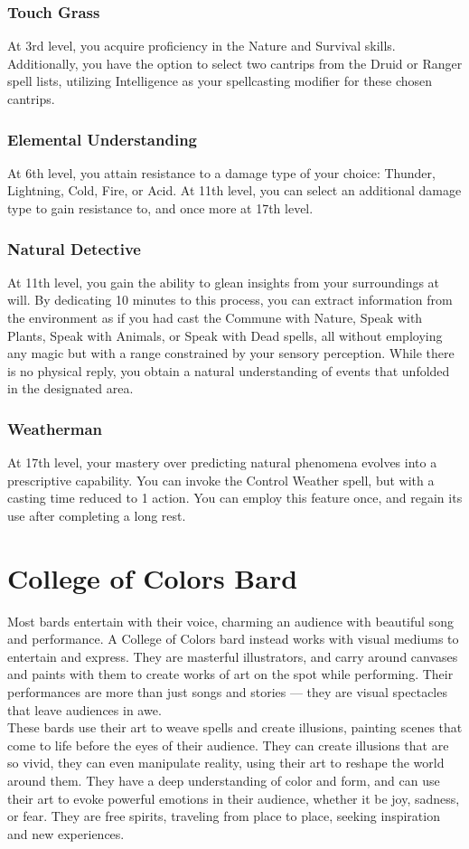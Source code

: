 \subsubsection{Touch Grass}
At 3rd level, you acquire proficiency in the Nature and Survival skills. Additionally, you have the option to select two cantrips from the Druid or Ranger spell lists, utilizing Intelligence as your spellcasting modifier for these chosen cantrips.
\subsubsection{Elemental Understanding}
At 6th level, you attain resistance to a damage type of your choice: Thunder, Lightning, Cold, Fire, or Acid. At 11th level, you can select an additional damage type to gain resistance to, and once more at 17th level.
\subsubsection{Natural Detective}
At 11th level, you gain the ability to glean insights from your surroundings at will. By dedicating 10 minutes to this process, you can extract information from the environment as if you had cast the Commune with Nature, Speak with Plants, Speak with Animals, or Speak with Dead spells, all without employing any magic but with a range constrained by your sensory perception. While there is no physical reply, you obtain a natural understanding of events that unfolded in the designated area.
\subsubsection{Weatherman}
At 17th level, your mastery over predicting natural phenomena evolves into a prescriptive capability. You can invoke the Control Weather spell, but with a casting time reduced to 1 action. You can employ this feature once, and regain its use after completing a long rest.
\raggedbottom
\pagebreak

\section{College of Colors Bard}\label{Colors}
Most bards entertain with their voice, charming an audience with beautiful song and performance. A College of Colors bard instead works with visual mediums to entertain and express. They are masterful illustrators, and carry around canvases and paints with them to create works of art on the spot while performing. Their performances are more than just songs and stories --- they are visual spectacles that leave audiences in awe.\\
These bards use their art to weave spells and create illusions, painting scenes that come to life before the eyes of their audience. They can create illusions that are so vivid, they can even manipulate reality, using their art to reshape the world around them. They have a deep understanding of color and form, and can use their art to evoke powerful emotions in their audience, whether it be joy, sadness, or fear. They are free spirits, traveling from place to place, seeking inspiration and new experiences.

